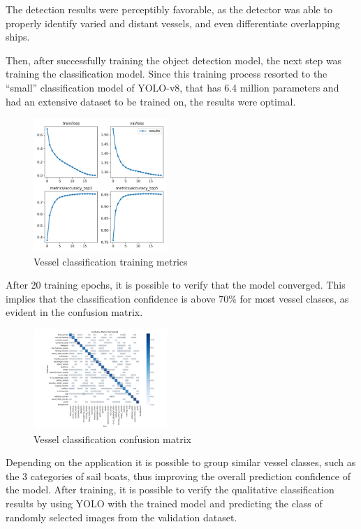 \documentclass[a4paper,12pt]{article}
\begin{document}
\begin{multicols}{2}
The detection results were perceptibly favorable, as the detector was able to properly identify varied and distant vessels, and even differentiate overlapping ships.

Then, after successfully training the object detection model, the next step was training the classification model.
Since this training process resorted to the ``small'' classification model of YOLO-v8, that has 6.4 million parameters and had an extensive dataset to be trained on, the results were optimal.

\begin{figure}[H]
    \centering
    \includegraphics[width=0.45\textwidth]{images/classification/classification_results}
    \caption{Vessel classification training metrics}
    \label{fig:4}
\end{figure}

After 20 training epochs, it is possible to verify that the model converged.
This implies that the classification confidence is above 70\% for most vessel classes, as evident in the confusion matrix.

\begin{figure}[H]
    \centering
    \includegraphics[width=0.45\textwidth]{images/classification/confusion_matrix_normalized}
    \caption{Vessel classification confusion matrix}
    \label{fig:5}
\end{figure}

Depending on the application it is possible to group similar vessel classes, such as the 3 categories of sail boats, thus improving the overall prediction confidence of the model.
After training, it is possible to verify the qualitative classification results by using YOLO with the trained model and predicting the class of randomly selected images from the validation dataset.


\end{multicols}
\end{document}
